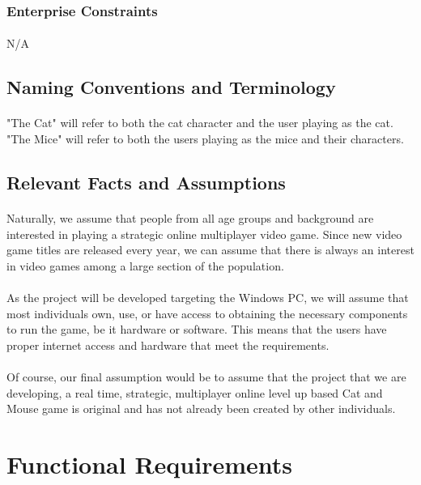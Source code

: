 \documentclass[12pt, titlepage]{article}
\begin{document}
\subsubsection{Enterprise Constraints}
\paragraph{}N/A
\subsection{Naming Conventions and Terminology}
\paragraph{}"The Cat" will refer to both the cat character and the user playing as the cat. "The Mice" will refer to both the users playing as the mice and their characters.
\subsection{Relevant Facts and Assumptions}
\paragraph{}Naturally, we assume that people from all age groups and background are interested in playing a strategic online multiplayer video game. Since new video game titles are released every year, we can assume that there is always an interest in video games among a large section of the population.
\paragraph{}As the project will be developed targeting the Windows PC, we will assume that most individuals own, use, or have access to obtaining the necessary components to run the game, be it hardware or software.
This means that the users have proper internet access and hardware that meet the requirements.
\paragraph{}Of course, our final assumption would be to assume that the project that we are developing, a real time, strategic, multiplayer online level up based Cat and Mouse game is original and has not already been created by other individuals.
\section{Functional Requirements}
\end{document}
